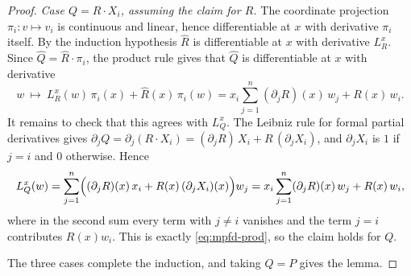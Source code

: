 \begin{proof}
\emph{Case $Q=R\cdot X_i$, assuming the claim for $R$.} The coordinate
projection $\pi_i:v\mapsto v_i$ is continuous and linear, hence differentiable at
$x$ with derivative $\pi_i$ itself. By the induction hypothesis $\widehat{R}$ is
differentiable at $x$ with derivative $L_R^x$. Since
$\widehat{Q}=\widehat{R}\cdot\pi_i$, the product rule gives that $\widehat{Q}$ is
differentiable at $x$ with derivative
\begin{equation}\label{eq:mpfd-prod}
  w\ \longmapsto\ L_R^x(w)\,\pi_i(x)+\widehat{R}(x)\,\pi_i(w)
  =x_i\sum_{j=1}^{n}(\partial_jR)(x)\,w_j+R(x)\,w_i .
\end{equation}
It remains to check that this agrees with $L_Q^x$. The Leibniz rule for formal
partial derivatives gives
$\partial_jQ=\partial_j(R\cdot X_i)=(\partial_jR)\,X_i+R\,(\partial_jX_i)$, and
$\partial_jX_i$ is $1$ if $j=i$ and $0$ otherwise. Hence
\[
  L_Q^x(w)=\sum_{j=1}^{n}\Bigl((\partial_jR)(x)\,x_i+R(x)\,(\partial_jX_i)(x)\Bigr)w_j
  =x_i\sum_{j=1}^{n}(\partial_jR)(x)\,w_j+R(x)\,w_i,
\]
where in the second sum every term with $j\ne i$ vanishes and the term $j=i$
contributes $R(x)w_i$. This is exactly \eqref{eq:mpfd-prod}, so the claim holds
for $Q$.

The three cases complete the induction, and taking $Q=P$ gives the lemma.
\end{proof}

